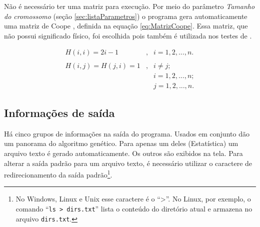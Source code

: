 	Não é necessário ter uma matriz para execução. Por meio do parâmetro \emph{Tamanho do cromossomo} (seção \ref{sec:listaParametros}) o programa gera automaticamente uma matriz de Coope \cite{Coope1977}, definida na equação \ref{eq:MatrizCoope}. Essa matriz, que não possui significado físico, foi escolhida pois também é utilizada nos testes de \cite{metodo2011}.
	
	\begin{equation}\label{eq:MatrizCoope}
		\begin{array}{ccl}
			H(i,i) = 2i - 1 			& , & i = 1, 2, ..., n. \\
														&		&		\\
			H(i,j) = H(j,i) = 1		& , & i \neq j; \\
														&		& i = 1, 2, ..., n; \\
														&		& j = 1, 2, ..., n.
		\end{array}
	\end{equation}
	
\subsection{Informações de saída}
		
Há cinco grupos de informações na saída do programa. Usados em conjunto dão um panorama do algoritmo genético. Para apenas um deles (Estatística) um arquivo texto é gerado automaticamente. Os outros são exibidos na tela. Para alterar a saída padrão para um arquivo texto, é necessário utilizar o caractere de redirecionamento da saída padrão\footnote{No Windows, Linux e Unix esse caractere é o ``>''. No Linux, por exemplo, o comando ``\texttt{ls > dirs.txt}'' lista o conteúdo do diretório atual e armazena no arquivo \texttt{dirs.txt}.}.

